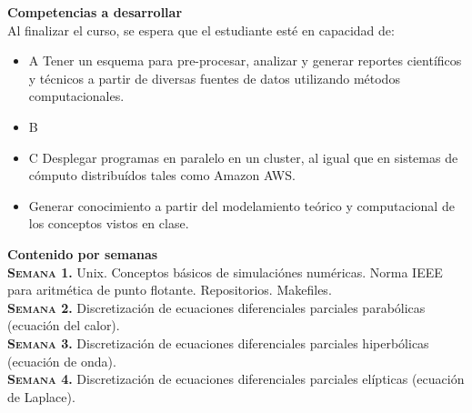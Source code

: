 \documentclass[letterpaper,10pt,onecolumn]{article}
\begin{document}
\noindent\textbf{\large {} \quad Competencias a
  desarrollar}\\[-0.2cm] 


\noindent\normalsize Al finalizar el curso, se espera que el
estudiante est\'e en capacidad de: 

\begin{itemize}
	\item A  Tener un esquema para pre-procesar, analizar y generar reportes científicos y técnicos a partir de diversas fuentes de datos utilizando métodos computacionales. \\[-0.6cm]
	\item B\\[-0.6cm] 
	\item C  Desplegar programas en paralelo en un cluster, al igual que en sistemas de cómputo distribuídos tales como Amazon AWS.\\[-0.6cm]
	\item Generar conocimiento a partir del modelamiento te\'orico
          y computacional de los conceptos vistos en clase.\\[-0.2cm] 
\end{itemize}

\noindent\textbf{\large {} \quad Contenido por
  semanas}\\[-0.2cm] 



\noindent\normalsize\textbf{\textsc{Semana 1.}} Unix. Conceptos b\'asicos de
simulaci\'ones num\'ericas. Norma IEEE para aritm\'etica de punto
flotante. Repositorios. Makefiles.
\\[-0.3cm]   

\noindent\textbf{\textsc{Semana 2.}} 
Discretizaci\'on de ecuaciones
diferenciales parciales parab\'olicas (ecuaci\'on del calor).   
\\[-0.3cm]  

\noindent\textbf{\textsc{Semana 3.}} 
Discretizaci\'on de ecuaciones
diferenciales parciales hiperb\'olicas (ecuaci\'on de onda).   
\\[-0.3cm]  

\noindent\textbf{\textsc{Semana 4.}} 
Discretizaci\'on de ecuaciones
diferenciales parciales el\'ipticas (ecuaci\'on de Laplace).   
\\[-0.3cm]  
\end{document}

